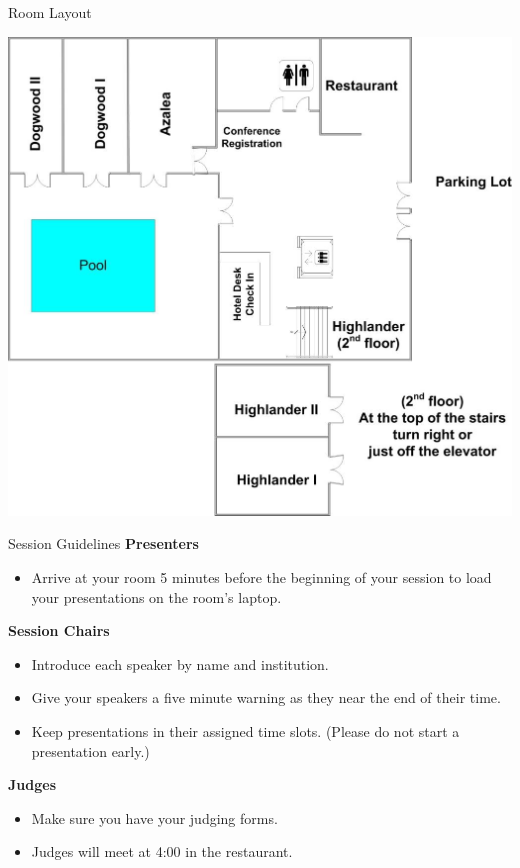 \documentclass[handout]{beamer}
\begin{document}
\begin{frame}{Room Layout}
    \begin{center}
        \includegraphics[height=0.85\textheight]{floorplan}
    \end{center}
\end{frame}

\begin{frame}{Session Guidelines}
    \textbf{Presenters}
    \begin{itemize}
        \item Arrive at your room 5 minutes before the beginning of
            your session to load your presentations on the room's
            laptop.
    \end{itemize}

    \textbf{Session Chairs}
    \begin{itemize}
        \item Introduce each speaker by name and institution.
        \item Give your speakers a five minute warning as they near
            the end of their time.
        \item Keep presentations in their assigned time slots. (Please do not
            start a presentation early.)
    \end{itemize}

    \textbf{Judges}
    \begin{itemize}
        \item Make sure you have your judging forms.
        \item Judges will meet at 4:00 in the restaurant.
    \end{itemize}
\end{frame}
\end{document}
